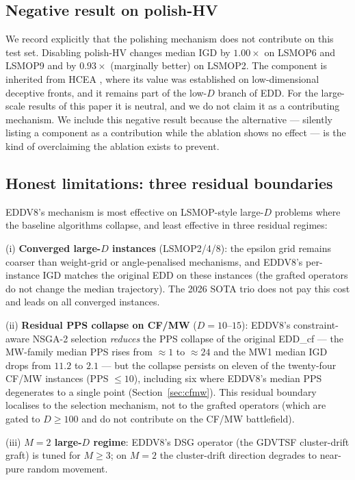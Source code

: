 \documentclass[preprint,12pt]{elsarticle}
\begin{document}


\subsection{Negative result on polish-HV}

We record explicitly that the polishing mechanism does not contribute on this
test set. Disabling polish-HV changes median IGD by $1.00\times$ on LSMOP6
and LSMOP9 and by $0.93\times$ (marginally better) on LSMOP2. The component
is inherited from HCEA \cite{hcea2026}, where its value was established on
low-dimensional deceptive fronts, and it remains part of the low-$D$ branch
of EDD. For the large-scale results of this paper it is neutral, and we do
not claim it as a contributing mechanism. We include this negative result
because the alternative --- silently listing a component as a contribution
while the ablation shows no effect --- is the kind of overclaiming the
ablation exists to prevent.

\subsection{Honest limitations: three residual boundaries}

EDDV8's mechanism is most effective on LSMOP-style large-$D$ problems where
the baseline algorithms collapse, and least effective in three residual
regimes:

(i) \textbf{Converged large-$D$ instances} (LSMOP2/4/8): the epsilon grid
remains coarser than weight-grid or angle-penalised mechanisms, and EDDV8's
per-instance IGD matches the original EDD on these instances (the grafted
operators do not change the median trajectory). The 2026 SOTA trio does
not pay this cost and leads on all converged instances.

(ii) \textbf{Residual PPS collapse on CF/MW}
($D = 10$--$15$): EDDV8's constraint-aware NSGA-2 selection \emph{reduces}
the PPS collapse of the original EDD\_cf --- the MW-family median PPS
rises from $\approx 1$ to $\approx 24$ and the MW1 median IGD drops from
$11.2$ to $2.1$ --- but the collapse persists on eleven of the
twenty-four CF/MW instances (PPS $\le 10$), including six where EDDV8's
median PPS degenerates to a single point (Section~\ref{sec:cfmw}). This
residual boundary localises to the selection mechanism, not to the grafted
operators (which are gated to $D \ge 100$ and do not contribute on the
CF/MW battlefield).

(iii) \textbf{$M = 2$ large-$D$ regime}: EDDV8's DSG operator (the
GDVTSF cluster-drift graft) is tuned for $M \ge 3$; on $M = 2$ the
cluster-drift direction degrades to near-pure random movement.
\end{document}
